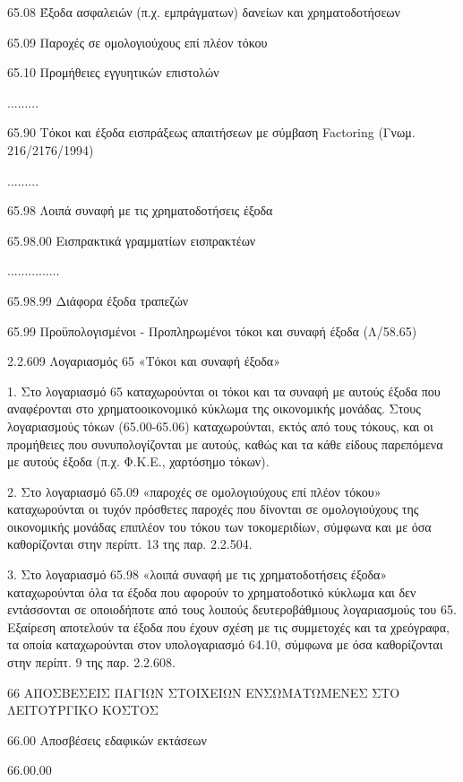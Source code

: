 \documentclass[A4,10pt,greek]{book}
\begin{document}
        65.08   Έξοδα ασφαλειών (π.χ. εμπράγματων) δανείων και χρηματοδοτήσεων

        65.09   Παροχές σε ομολογιούχους επί πλέον τόκου

        65.10   Προμήθειες εγγυητικών επιστολών

        .........

        65.90   Τόκοι και έξοδα εισπράξεως απαιτήσεων με σύμβαση Factoring
                     (Γνωμ. 216/2176/1994)

        .........

        65.98   Λοιπά συναφή με τις χρηματοδοτήσεις έξοδα

                     65.98.00   Εισπρακτικά γραμματίων εισπρακτέων

                     ...............

                    65.98.99   Διάφορα έξοδα τραπεζών

        65.99    Προϋπολογισμένοι - Προπληρωμένοι τόκοι και συναφή
                     έξοδα (Λ/58.65)

2.2.609 Λογαριασμός 65 «Τόκοι και συναφή έξοδα»

1. Στο λογαριασμό 65 καταχωρούνται οι τόκοι και τα συναφή με αυτούς έξοδα που αναφέρονται στο χρηματοοικονομικό κύκλωμα της οικονομικής μονάδας. Στους λογαριασμούς τόκων (65.00-65.06) καταχωρούνται, εκτός από τους τόκους, και οι προμήθειες που συνυπολογίζονται με αυτούς, καθώς και τα κάθε είδους παρεπόμενα με αυτούς έξοδα (π.χ. Φ.Κ.Ε., χαρτόσημο τόκων).

2. Στο λογαριασμό 65.09 «παροχές σε ομολογιούχους επί πλέον τόκου» καταχωρούνται οι τυχόν πρόσθετες παροχές που δίνονται σε ομολογιούχους της οικονομικής μονάδας επιπλέον του τόκου των τοκομεριδίων, σύμφωνα και με όσα καθορίζονται στην περίπτ. 13 της παρ. 2.2.504.

3. Στο λογαριασμό 65.98 «λοιπά συναφή με τις χρηματοδοτήσεις έξοδα» καταχωρούνται όλα τα έξοδα που αφορούν το χρηματοδοτικό κύκλωμα και δεν εντάσσονται σε οποιοδήποτε από τους λοιπούς δευτεροβάθμιους λογαριασμούς του 65. Εξαίρεση αποτελούν τα έξοδα που έχουν σχέση με τις συμμετοχές και τα χρεόγραφα, τα οποία καταχωρούνται στον υπολογαριασμό 64.10, σύμφωνα με όσα καθορίζονται στην περίπτ. 9 της παρ. 2.2.608.

66   ΑΠΟΣΒΕΣΕΙΣ ΠΑΓΙΩΝ ΣΤΟΙΧΕΙΩΝ ΕΝΣΩΜΑΤΩΜΕΝΕΣ
        ΣΤΟ ΛΕΙΤΟΥΡΓΙΚΟ ΚΟΣΤΟΣ

        66.00   Αποσβέσεις εδαφικών εκτάσεων

                     66.00.00
\end{document}
